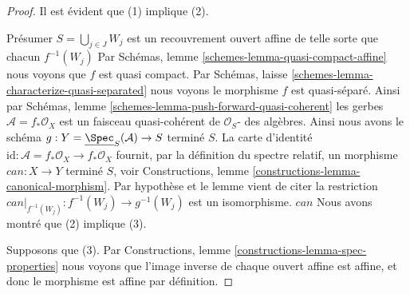 \begin{proof}
Il est évident que (1) implique (2).

\medskip\noindent

Présumer $S = \bigcup_{j \in J} W_j$ est un recouvrement ouvert affine de telle sorte que chacun $f^{-1}(W_j)$ Par Schémas, lemme \ref{schemes-lemma-quasi-compact-affine} nous voyons que $f$ est quasi compact. Par Schémas, laisse \ref{schemes-lemma-characterize-quasi-separated}
nous voyons le morphisme $f$ est quasi-séparé. Ainsi par Schémas, lemme \ref{schemes-lemma-push-forward-quasi-coherent} les gerbes $\mathcal{A} = f_*\mathcal{O}_X$ est un faisceau quasi-cohérent de $\mathcal{O}_S$- des algèbres. Ainsi nous avons le schéma
$g : Y = \underline{\Spec}_S(\mathcal{A}) \to S$ terminé $S$. La carte d'identité
$\text{id} : \mathcal{A} = f_*\mathcal{O}_X \to f_*\mathcal{O}_X$
fournit, par la définition du spectre relatif, un morphisme $can : X \to Y$ terminé $S$, voir Constructions, lemme \ref{constructions-lemma-canonical-morphism}. Par hypothèse et le lemme vient de citer la restriction $can|_{f^{-1}(W_j)} : f^{-1}(W_j) \to g^{-1}(W_j)$
est un isomorphisme. $can$ Nous avons montré que (2) implique (3).

\medskip\noindent

Supposons que (3). Par Constructions, lemme \ref{constructions-lemma-spec-properties}
nous voyons que l'image inverse de chaque ouvert affine est affine, et donc le morphisme est affine par définition.

\end{proof}

